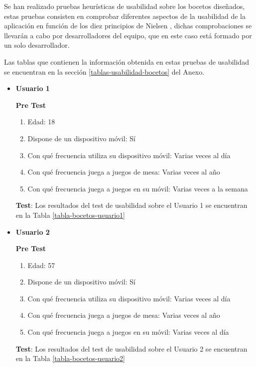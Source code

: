 Se han realizado pruebas heurísticas de usabilidad sobre los bocetos diseñados, estas pruebas consisten en comprobar diferentes aspectos de la usabilidad de la aplicación en función de los diez principios de Nielsen \cite{nielsen}, dichas comprobaciones se llevarán a cabo por desarrolladores del equipo, que en este caso está formado por un solo desarrollador.

Las tablas que contienen la información obtenida en estas pruebas de usabilidad se encuentran en la sección \ref{tablas-usabilidad-bocetos} del Anexo.

\begin{itemize}
  \item \textbf{Usuario 1}

  \textbf{Pre Test}

  \begin{enumerate}
    \item Edad: 18
    \item Dispone de un dispositivo móvil: Sí
    \item Con qué frecuencia utiliza su dispositivo móvil: Varias veces al día
    \item Con qué frecuencia juega a juegos de mesa: Varias veces al año
    \item Con qué frecuencia juega a juegos en su móvil: Varias veces a la semana
  \end{enumerate}

  \textbf{Test}: Los resultados del test de usabilidad sobre el Usuario 1 se encuentran en la Tabla \ref{tabla-bocetos-usuario1}


  \item \textbf{Usuario 2}

  \textbf{Pre Test}

  \begin{enumerate}
    \item Edad: 57
    \item Dispone de un dispositivo móvil: Sí
    \item Con qué frecuencia utiliza su dispositivo móvil: Varias veces al día
    \item Con qué frecuencia juega a juegos de mesa: Varias veces al año
    \item Con qué frecuencia juega a juegos en su móvil: Varias veces al día
  \end{enumerate}

  \textbf{Test}: Los resultados del test de usabilidad sobre el Usuario 2 se encuentran en la Tabla \ref{tabla-bocetos-usuario2}



\end{itemize}

